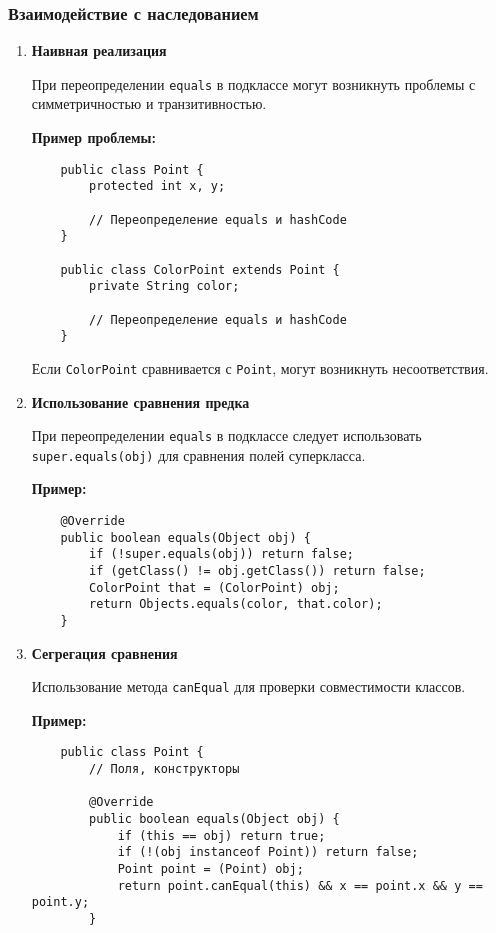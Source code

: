 \subsubsection{Взаимодействие с наследованием}
\begin{enumerate}
    \item \textbf{Наивная реализация}
    
    При переопределении \texttt{equals} в подклассе могут возникнуть проблемы с симметричностью и транзитивностью.
    
    \textbf{Пример проблемы:}
    \begin{verbatim}
    public class Point {
        protected int x, y;

        // Переопределение equals и hashCode
    }

    public class ColorPoint extends Point {
        private String color;

        // Переопределение equals и hashCode
    }
    \end{verbatim}
    
    Если \texttt{ColorPoint} сравнивается с \texttt{Point}, могут возникнуть несоответствия.
    
    \item \textbf{Использование сравнения предка}
    
    При переопределении \texttt{equals} в подклассе следует использовать \texttt{super.equals(obj)} для сравнения полей суперкласса.
    
    \textbf{Пример:}
    \begin{verbatim}
    @Override
    public boolean equals(Object obj) {
        if (!super.equals(obj)) return false;
        if (getClass() != obj.getClass()) return false;
        ColorPoint that = (ColorPoint) obj;
        return Objects.equals(color, that.color);
    }
    \end{verbatim}
    
    \item \textbf{Сегрегация сравнения}
    
    Использование метода \texttt{canEqual} для проверки совместимости классов.
    
    \textbf{Пример:}
    \begin{verbatim}
    public class Point {
        // Поля, конструкторы

        @Override
        public boolean equals(Object obj) {
            if (this == obj) return true;
            if (!(obj instanceof Point)) return false;
            Point point = (Point) obj;
            return point.canEqual(this) && x == point.x && y == point.y;
        }


\end{verbatim}
\end{enumerate}

